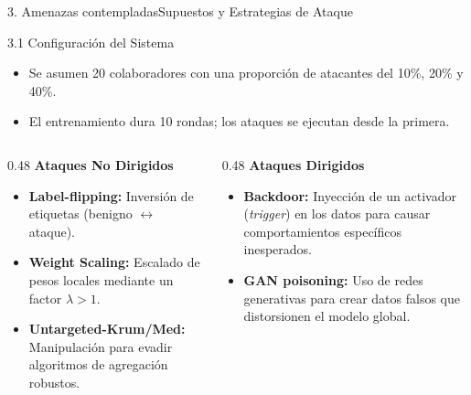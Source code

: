 \begin{frame}{3. Amenazas contempladas}{Supuestos y Estrategias de Ataque}
    \begin{block}{3.1 Configuración del Sistema}
        \begin{itemize}
            \item Se asumen 20 colaboradores con una proporción de atacantes del 10\%, 20\% y 40\%.
            \item El entrenamiento dura 10 rondas; los ataques se ejecutan desde la primera.
        \end{itemize}
    \end{block}

    \begin{columns}[t]
        \begin{column}{0.48\textwidth}
            \textbf{Ataques No Dirigidos}
            \begin{itemize}
                \item \textbf{Label-flipping:} Inversión de etiquetas (benigno $\leftrightarrow$ ataque).
                \item \textbf{Weight Scaling:} Escalado de pesos locales mediante un factor $\lambda > 1$.
                \item \textbf{Untargeted-Krum/Med:} Manipulación para evadir algoritmos de agregación robustos.
            \end{itemize}
        \end{column}
        \begin{column}{0.48\textwidth}
            \textbf{Ataques Dirigidos}
            \begin{itemize}
                \item \textbf{Backdoor:} Inyección de un activador (\textit{trigger}) en los datos para causar comportamientos específicos inesperados.
                \item \textbf{GAN poisoning:} Uso de redes generativas para crear datos falsos que distorsionen el modelo global.
            \end{itemize}
        \end{column}
    \end{columns}
\end{frame}

